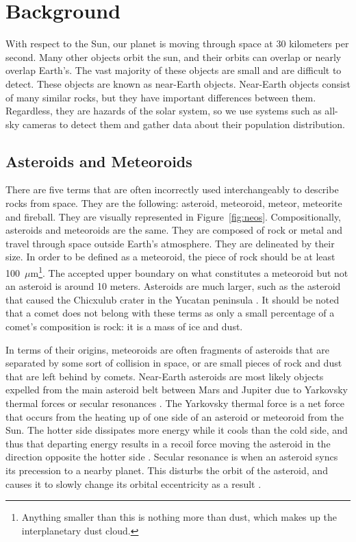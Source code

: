 \chapter{Background}
With respect to the Sun, our planet is moving through space at 30 kilometers per second. Many other objects orbit the sun, and their orbits can overlap or nearly overlap Earth's. The vast majority of these objects are small and are difficult to detect. These objects are known as near-Earth objects. Near-Earth objects consist of many similar rocks, but they have important differences between them. Regardless, they are hazards of the solar system, so we use systems such as all-sky cameras to detect them and gather data about their population distribution.

\section{Asteroids and Meteoroids}
There are five terms that are often incorrectly used interchangeably to describe rocks from space. They are the following: asteroid, meteoroid, meteor, meteorite and fireball. They are visually represented in Figure~\ref{fig:neos}. Compositionally, asteroids and meteoroids are the same. They are composed of rock or metal and travel through space outside Earth's atmosphere. They are delineated by their size.  In order to be defined as a meteoroid, the piece of rock should be at least \mbox{100 $\mu$m}\footnote{Anything smaller than this is nothing more than dust, which makes up the interplanetary dust cloud.}\cite{Steel1996}. The accepted upper boundary on what constitutes a meteoroid but not an asteroid is around 10 meters. Asteroids are much larger, such as the asteroid that caused the Chicxulub crater in the Yucatan peninsula \cite{Bottke2007}. It should be noted that a comet does not belong with these terms as only a small percentage of a comet's composition is rock: it is a mass of ice and dust. 

In terms of their origins, meteoroids are often fragments of asteroids that are separated by some sort of collision in space, or are small pieces of rock and dust that are left behind by comets. Near-Earth asteroids are most likely objects expelled from the main asteroid belt between Mars and Jupiter due to Yarkovsky thermal forces or secular resonances \cite{Bottke2007}. The Yarkovsky thermal force is a net force that occurs from the heating up of one side of an asteroid or meteoroid from the Sun. The hotter side dissipates more energy while it cools than the cold side, and thus that departing energy results in a recoil force moving the asteroid in the direction opposite the hotter side \cite{Bottke2006}. Secular resonance is when an asteroid syncs its precession to a nearby planet. This disturbs the orbit of the asteroid, and causes it to slowly change its orbital eccentricity as a result \cite{Moons1995}.

